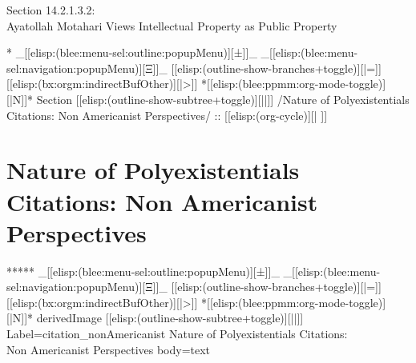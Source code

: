 \begin{whenOrg}
\begin{verblatex}
\begin{frame}[fragile,plain,label=citation_ethicalCures]
    \bigskip

  \begin{large}
Section 14.2.1.3.2:\\[10pt] Ayatollah Motahari Views Intellectual Property as Public Property
  \end{large}



\end{frame}
\end{verblatex}



\begin{whenOrg}
*  _[[elisp:(blee:menu-sel:outline:popupMenu)][±]]_ _[[elisp:(blee:menu-sel:navigation:popupMenu)][Ξ]]_ [[elisp:(outline-show-branches+toggle)][|=]] [[elisp:(bx:orgm:indirectBufOther)][|>]] *[[elisp:(blee:ppmm:org-mode-toggle)][|N]]*  Section    [[elisp:(outline-show-subtree+toggle)][||]]   /Nature of Polyexistentials Citations: Non Americanist Perspectives/ ::  [[elisp:(org-cycle)][| ]]
\end{whenOrg}

\section{Nature of Polyexistentials Citations: Non Americanist Perspectives}


\begin{whenOrg}
*****  _[[elisp:(blee:menu-sel:outline:popupMenu)][±]]_ _[[elisp:(blee:menu-sel:navigation:popupMenu)][Ξ]]_ [[elisp:(outline-show-branches+toggle)][|=]] [[elisp:(bx:orgm:indirectBufOther)][|>]] *[[elisp:(blee:ppmm:org-mode-toggle)][|N]]*  derivedImage [[elisp:(outline-show-subtree+toggle)][||]] Label=citation_nonAmericanist Nature of Polyexistentials Citations:\\ Non Americanist Perspectives body=text
\end{whenOrg}


\end{whenOrg}
